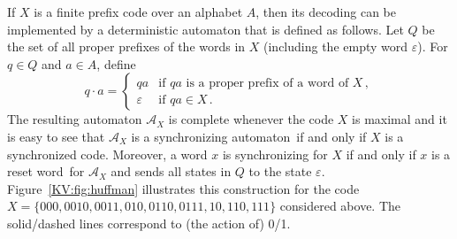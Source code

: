 \documentclass{irmaart}
\newcommand{\san}{synchronizing au\-tom\-a\-ton}
\newcommand{\sw}{reset word}
\theoremstyle{plain}
\begin{document}
If $X$ is a finite prefix code over an alphabet $A$, then its
decoding can be implemented by a deterministic automaton that is
defined as follows. Let $Q$ be the set of all proper prefixes of
the words in $X$ (including the empty word $\varepsilon$). For
$q\in Q$ and $a\in A$, define
\begin{displaymath}
q\cdot a =\begin{cases} qa & \text{if $qa$ is a proper prefix of a word of $X$}\,,\\
\varepsilon & \text{if $qa \in X$}\,.\end{cases}
\end{displaymath}
The resulting automaton $\mathcal{A}_X$ is complete whenever the code $X$
is maximal and it is easy to see that $\mathcal{A}_X$ is a \san\ if and only
if $X$ is a synchronized code. Moreover, a word $x$ is synchronizing for $X$
if and only if $x$ is a \sw\ for $\mathcal{A}_X$ and sends all states in $Q$
to the state $\varepsilon$. Figure~\ref{KV:fig:huffman} illustrates this construction
for the code $X=\{000,0010,0011,010,0110,0111,10,110,111\}$ considered above.
The solid/dashed lines correspond to (the action of) 0/1.
\end{document}
